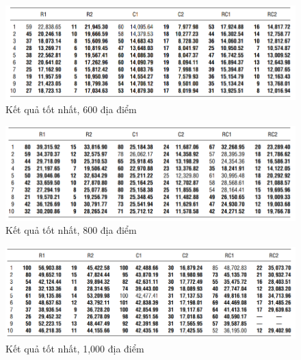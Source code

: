 \begin{center}
    \begin{figure}[htp]
    \caption{Kết quả tốt nhất, 600 địa điểm}        
    \begin{center}
     \includegraphics[scale=.5]{figures/Thuy_table14}
    \end{center}
    \end{figure}
\end{center}

\begin{center}
    \begin{figure}[htp]
    \caption{Kết quả tốt nhất, 800 địa điểm}        
    \begin{center}
     \includegraphics[scale=.5]{figures/Thuy_table15}
    \end{center}
    \end{figure}
\end{center}

\begin{center}
    \begin{figure}[htp]
    \caption{Kết quả tốt nhất, 1,000 địa điểm}        
    \begin{center}
     \includegraphics[scale=.5]{figures/Thuy_table16}
    \end{center}
    \end{figure}
\end{center}



